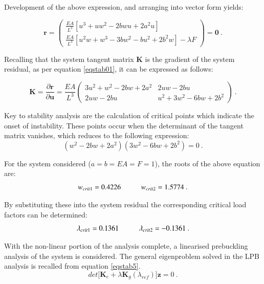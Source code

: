 Development of the above expression, and arranging into vector form yields:

\begin{equation} 
\mathbf{r} = 
\begin{pmatrix}
\frac{EA}{L^3} [u^3+uw^2-2bwu+2a^2u] \\
\frac{EA}{L^3} [u^2w + w^3 - 3bw^2 - bu^2 +2b^2w] - \lambda F
\end{pmatrix}
=
\mathbf{0}
\label{eqapp0_6_1}\ .
\end{equation}

Recalling that the system tangent matrix $\mathbf{K}$ is the gradient of the system residual, as per equation \ref{eqstab01}, it can be expressed as follows:

\begin{equation} 
\mathbf{K} = 
\frac{\partial \mathbf{r}}{\partial \mathbf{u}}
=
\frac{EA}{L^3}
\begin{pmatrix}
3u^2 + w^2 - 2bw +2a^2 & 2uw -2bu \\
2uw - 2bu & u^2 + 3w^2 - 6bw + 2b^2
\end{pmatrix}
\label{eqapp0_7}\ .
\end{equation}

Key to stability analysis are the calculation of critical points which indicate the onset of instability. These points occur when the determinant of the tangent matrix vanishes, which reduces to the following expression:
\begin{equation} 
(w^2 - 2bw +2a^2)
(3w^2 -6bw +2b^2) = 0
\label{eqapp0_8}\ .
\end{equation}

For the system considered ($a=b=EA=F=1$), the roots of the above equation are:
\begin{equation} 
w_{crit1} = 0.4226
\hspace{10mm}
w_{crit2} = 1.5774
\label{eqapp0_9}\ .
\end{equation}

By substituting these into the system residual the corresponding critical load factors can be determined:
\begin{equation} 
\lambda_{crit1} = 0.1361
\hspace{10mm}
\lambda_{crit2} = -0.1361
\label{eqapp0_10}\ .
\end{equation}

With the non-linear portion of the analysis complete, a linearised prebuckling analysis of the system is considered. The general eigenproblem solved in the LPB analysis is recalled from equation \ref{eqstab5}.
 \begin{equation} 
det\big[
\mathbf{K}_e +
{\lambda}
\mathbf{K}_g(\lambda_{ref})
\big]\mathbf{z} = 0
\label{eqapp0_11}\ .
\end{equation}

